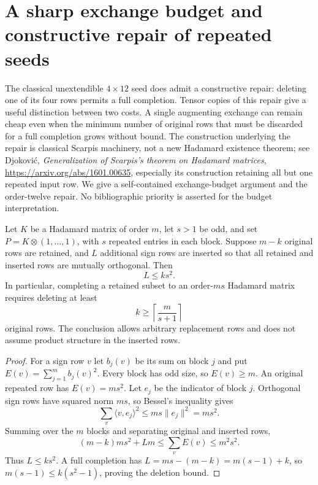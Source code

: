 \section{A sharp exchange budget and constructive repair of repeated seeds}
\label{sec:completion-budget}

The classical unextendible $4\times12$ seed does admit a constructive
repair: deleting one of its four rows permits a full completion.
Tensor copies of this repair give a useful distinction between two
costs. A single augmenting exchange can remain cheap even when the
minimum number of original rows that must be discarded for a full
completion grows without bound. The construction underlying the repair
is classical Scarpis machinery, not a new Hadamard existence theorem;
see Djokovi\'c, \emph{Generalization of Scarpis's theorem on Hadamard
matrices}, \url{https://arxiv.org/abs/1601.00635}, especially its
construction retaining all but one repeated input row. We give a
self-contained exchange-budget argument and the order-twelve repair.
No bibliographic priority is asserted for the budget interpretation.

\begin{theorem}
Let $K$ be a Hadamard matrix of order $m$, let $s>1$ be odd, and set
$P=K\otimes(1,\ldots,1)$, with $s$ repeated entries in each block.
Suppose $m-k$ original rows are retained, and $L$ additional sign rows
are inserted so that all retained and inserted rows are mutually
orthogonal. Then
\[
 L\le k s^2.
\]
In particular, completing a retained subset to an order-$ms$ Hadamard
matrix requires deleting at least
\[
 k\ge\left\lceil\frac{m}{s+1}\right\rceil
\]
original rows. The conclusion allows arbitrary replacement rows and
does not assume product structure in the inserted rows.
\end{theorem}
\begin{proof}
For a sign row $v$ let $b_j(v)$ be its sum on block $j$ and put
$E(v)=\sum_{j=1}^m b_j(v)^2$. Every block has odd size, so $E(v)\ge m$.
An original repeated row has $E(v)=ms^2$.
Let $e_j$ be the indicator of block $j$. Orthogonal sign rows have
squared norm $ms$, so Bessel's inequality gives
\[
 \sum_v\langle v,e_j\rangle^2\le ms\|e_j\|^2=ms^2.
\]
Summing over the $m$ blocks and separating original and inserted rows,
\[
 (m-k)ms^2+Lm\le\sum_v E(v)\le m^2s^2.
\]
Thus $L\le ks^2$. A full completion has
$L=ms-(m-k)=m(s-1)+k$, so
$m(s-1)\le k(s^2-1)$, proving the deletion bound.
\end{proof}

